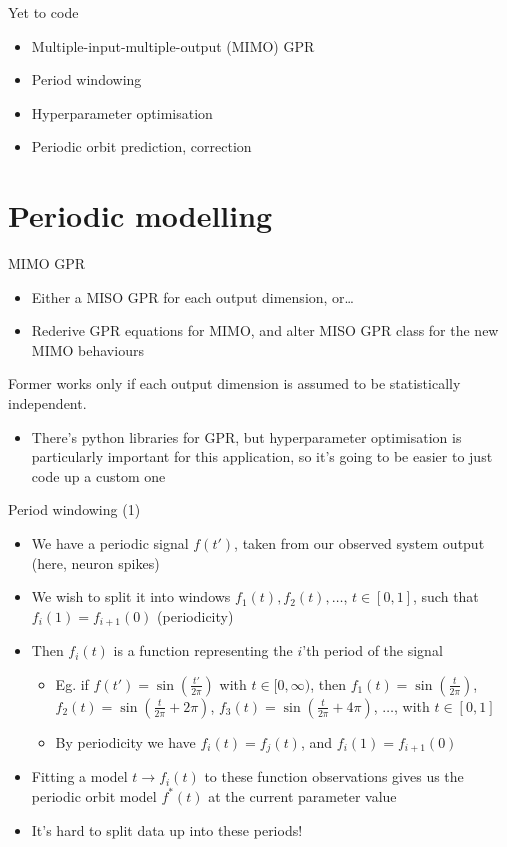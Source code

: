 \documentclass[presentation]{beamer}
\begin{document}
\begin{frame}[label={sec:orgf02655b}]{Yet to code}
\begin{itemize}
\item Multiple-input-multiple-output (MIMO) GPR
\item Period windowing
\item Hyperparameter optimisation
\item Periodic orbit prediction, correction
\end{itemize}
\end{frame}

\section{Periodic modelling}
\label{sec:orgaa0cafd}

\begin{frame}[label={sec:orgef4ddb9}]{MIMO GPR}
\begin{itemize}
\item Either a MISO GPR for each output dimension, or\ldots{}
\item Rederive GPR equations for MIMO, and alter MISO GPR class for the new MIMO behaviours
\end{itemize}

Former works only if each output dimension is assumed to be statistically independent.

\begin{itemize}
\item There's python libraries for GPR, but hyperparameter optimisation is particularly important for this application, so it's going to be easier to just code up a custom one
\end{itemize}
\end{frame}

\begin{frame}[label={sec:org1bd2557}]{Period windowing (1)}
\begin{itemize}
\item We have a periodic signal \(f(t')\), taken from our observed system output (here, neuron spikes)
\item We wish to split it into windows \(f_1(t), f_2(t), \dots\), \(t\in[0,1]\), such that \(f_i(1)=f_{i+1}(0)\) (periodicity)
\item Then \(f_i(t)\) is a function representing the \(i\)'th period of the signal
\begin{itemize}
\item Eg. if \(f(t')=\sin(\frac{t'}{2\pi})\) with \(t\in[0,\infty)\), then \(f_1(t) = \sin(\frac{t}{2\pi})\), \(f_2(t) = \sin(\frac{t}{2\pi} + 2\pi)\), \(f_3(t) = \sin(\frac{t}{2\pi} + 4\pi)\), \(\dots\), with \(t\in[0,1]\)
\item By periodicity we have \(f_i(t) = f_j(t)\), and \(f_i(1)=f_{i+1}(0)\)
\end{itemize}
\item Fitting a model \(t\to f_i(t)\) to these function observations gives us the periodic orbit model \(f^*(t)\) at the current parameter value
\item It's hard to split data up into these periods!
\end{itemize}
\end{frame}
\end{document}
